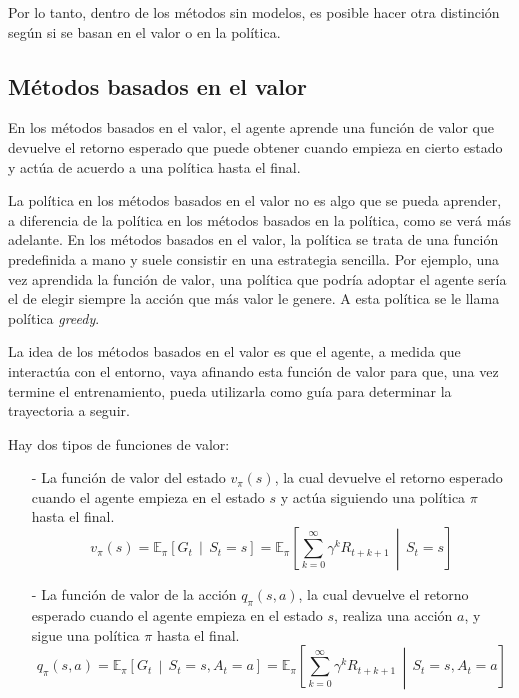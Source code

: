 Por lo tanto, dentro de los métodos sin modelos, es posible hacer otra distinción según si se basan en el valor o en la política.

\subsection{Métodos basados en el valor}

En los métodos basados en el valor, el agente aprende una función de valor que devuelve el retorno esperado que puede obtener cuando empieza en cierto estado y actúa de acuerdo a una política hasta el final.

\newpage

La política en los métodos basados en el valor no es algo que se pueda aprender, a diferencia de la política en los métodos basados en la política, como se verá más adelante. En los métodos basados en el valor, la política se trata de una función predefinida a mano y suele consistir en una estrategia sencilla. Por ejemplo, una vez aprendida la función de valor, una política que podría adoptar el agente sería el de elegir siempre la acción que más valor le genere. A esta política se le llama política \emph{greedy}.

La idea de los métodos basados en el valor es que el agente, a medida que interactúa con el entorno, vaya afinando esta función de valor para que, una vez termine el entrenamiento, pueda utilizarla como guía para determinar la trayectoria a seguir.

Hay dos tipos de funciones de valor:
\begin{enumerate}
    \item[-] La función de valor del estado $v_{\pi}(s)$, la cual devuelve el retorno esperado cuando el agente empieza en el estado $s$ y actúa siguiendo una política $\pi$ hasta el final.
        \begin{equation}
            v_{\pi}(s) = \mathbb{E}_{\pi} \left[ G_t \, \middle| \, S_t = s \right] = \mathbb{E}_{\pi} \left[ \sum_{k=0}^{\infty} \gamma^k R_{t+k+1} \, \middle| \, S_t = s \right]
            \label{state-value}
        \end{equation}
    \item[-] La función de valor de la acción $q_{\pi}(s, a)$, la cual devuelve el retorno esperado cuando el agente empieza en el estado $s$, realiza una acción $a$, y sigue una política $\pi$ hasta el final.
        \begin{equation}
            q_{\pi}(s, a) = \mathbb{E}_\pi \left[ G_t \, \middle| \, S_t = s, A_t = a \right] = \mathbb{E}_\pi \left[ \sum_{k=0}^{\infty} \gamma^k R_{t+k+1}  \, \middle| \, S_t = s, A_t = a \right] 
            \label{action-value}
        \end{equation}
\end{enumerate}


